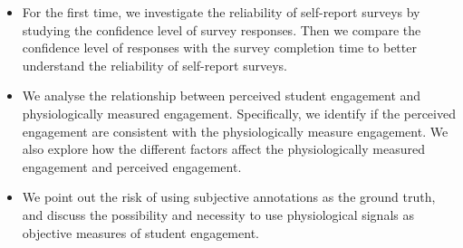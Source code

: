 \documentclass[sigconf]{acmart}
\begin{document}
\begin{itemize}
    \item For the first time, we investigate the reliability of self-report surveys by studying the confidence level of survey responses. Then we  compare the confidence level of responses with the survey completion time to better understand the reliability of self-report surveys.
    
     \item We analyse the relationship between perceived student engagement and physiologically measured engagement. Specifically, we identify if the perceived engagement are consistent with the physiologically measure engagement. We also explore how the different factors affect the physiologically measured engagement and perceived engagement.
     
    \item We point out the risk of using subjective annotations as the ground truth, and discuss the possibility and necessity to use physiological signals as objective measures of student engagement. 
\end{itemize}
\end{document}
